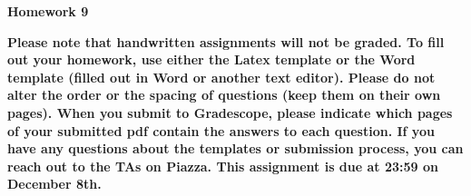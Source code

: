 \documentclass[12pt]{article}
\date{}
\begin{document}
	\begin{flushleft}
		\large \bf
		Homework 9 \\
	\end{flushleft}
{\bf
Please note that handwritten assignments will not be graded. To fill out your homework, use either the Latex template or the Word template (filled out in Word or another text editor). Please do not alter the order or the spacing of questions (keep them on their own pages). When you submit to Gradescope, please indicate which pages of your submitted pdf contain the answers to each question. If you have any questions about the templates or submission process, you can reach out to the TAs on Piazza. This assignment is due at 23:59 on December 8th.
}
\end{document}
